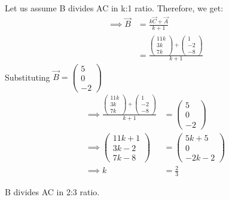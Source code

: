 \documentclass[12pt]{article}
\newcommand{\myvec}[1]{\ensuremath{\begin{pmatrix}#1\end{pmatrix}}}
\begin{document}
\begin{enumerate}
Let us assume B divides AC in k:1 ratio. Therefore, we get:
\begin{align}
    \implies \Vec{B} &= \frac{k\Vec{C}+\Vec{A}}{k+1}\\
    \label{eq:5}
    &= \frac{\myvec{11k \\ 3k \\ 7k} + \myvec{1 \\ -2 \\ -8}}{k+1}
    \label{eq:6}
\end{align}
Substituting $\Vec{B} = \myvec{5 \\ 0 \\ -2}$
\begin{align}
    \implies \frac{\myvec{11k \\ 3k \\ 7k} + \myvec{1 \\ -2 \\ -8}}{k+1} &= \myvec{5 \\ 0 \\ -2}\\
    \label{eq:7}
     \implies \myvec{11k+1 \\ 3k-2 \\ 7k-8} &= \myvec{5k+5 \\ 0 \\ -2k-2}\\
    \label{eq:8}
    \implies k &= \frac{2}{3}
    \label{eq:9}
\end{align}

B divides AC in 2:3 ratio.

\end{enumerate}
\end{document}
